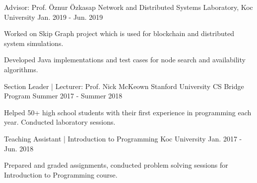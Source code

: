 
\begin{cventries}
  \cvopenentry
    {Advisor: Prof. Öznur Özkasap} %
    {Network and Distributed Systems Laboratory, Koc University} %
    {}
    {Jan. 2019 - Jun. 2019} %
    {
      \begin{cvitems} %
        \item {Worked on Skip Graph project which is used for blockchain and distributed system simulations.}
        \item {Developed Java implementations and test cases for node search and availability algorithms.}
      \end{cvitems}
    }

  \cvopenentry
    {Section Leader | Lecturer: Prof. Nick McKeown } %
    {Stanford University CS Bridge Program} %
    {}
    {Summer 2017 - Summer 2018} %
    {
      \begin{cvitems} %
        \item {Helped 50+ high school students with their first experience in programming each year. Conducted laboratory sessions.}
      \end{cvitems}
    }

  \cvopenentry
    {Teaching Assistant | Introduction to Programming } %
    {Koc University} %
    {}
    {Jan. 2017 - Jun. 2018} %
    {
      \begin{cvitems} %
        \item {Prepared and graded assignments, conducted problem solving sessions for Introduction to Programming course.}
      \end{cvitems}
    }


\end{cventries}
